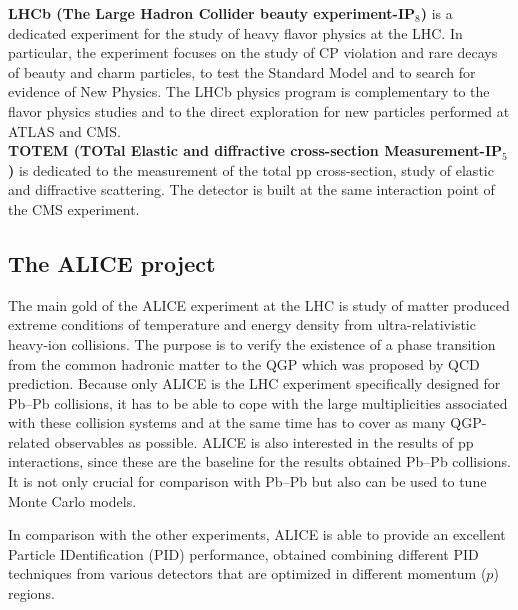 \textbf{LHCb (The Large Hadron Collider beauty experiment-IP$_{8}$)} \cite{cite:proposalLHCb} is a dedicated experiment for the study of heavy flavor physics at the LHC. In particular, the experiment focuses on the study of CP violation and rare decays of beauty and charm particles, to test the Standard Model and to search for evidence of New Physics. The LHCb physics program is complementary to the flavor physics studies and to the direct exploration for new particles performed at ATLAS and CMS. \\


\textbf{TOTEM (TOTal Elastic and diffractive cross-section Measurement-IP$_{5}$)} \cite{cite:proposalTOTEM} is dedicated to the measurement of the total pp cross-section, study of elastic and diffractive scattering. The detector is built at the same interaction point of the CMS experiment. \\

\subsection{The ALICE project}
The main gold of the ALICE experiment at the LHC \cite{cite:ALICE} is study of matter produced extreme conditions of temperature and energy density from ultra-relativistic heavy-ion collisions. The purpose is to verify the existence of a phase transition from the common hadronic matter to the QGP which was proposed by QCD prediction. Because only ALICE is the LHC experiment specifically designed for Pb--Pb collisions, it has to be able to cope with the large multiplicities associated with these collision systems and at the same time has to cover as many QGP-related observables as possible. ALICE is also interested in the results of pp interactions, since these are the baseline for the results obtained Pb--Pb collisions. It is not only crucial for comparison with Pb--Pb but also can be used to tune Monte Carlo models. 


In comparison with the other experiments, ALICE is able to provide an excellent Particle IDentification (PID) performance, obtained combining different PID techniques from various detectors that are optimized in different momentum ($\ensuremath{p}$) regions.

